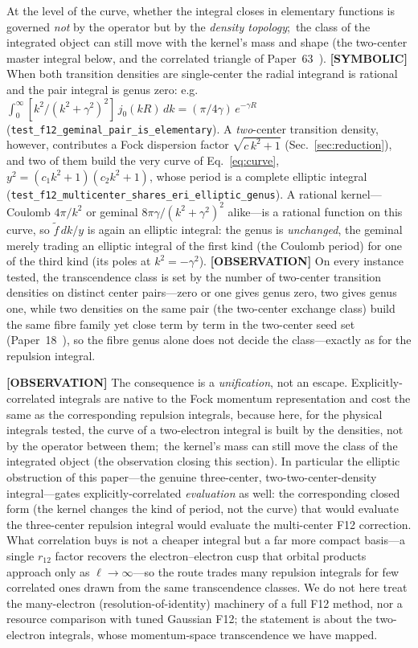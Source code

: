 \documentclass[aps,pra,twocolumn,superscriptaddress,longbibliography]{revtex4-2}
\begin{document}
At the level of the curve, whether the integral closes in elementary functions is governed
\emph{not} by the operator but by the \emph{density topology};\ the class of the integrated
object can still move with the kernel's mass and shape (the two-center master integral below,
and the correlated triangle of Paper~63~\cite{loutey_paper63}).  \textbf{[SYMBOLIC]} When both transition densities are
single-center the radial integrand is rational and the pair integral is genus zero: e.g.\
$\int_{0}^{\infty}[k^{2}/(k^{2}+\gamma^{2})^{2}]\,j_{0}(kR)\,dk=(\pi/4\gamma)\,e^{-\gamma R}$
(\texttt{test\_f12\_geminal\_pair\_is\_elementary}).  A \emph{two}-center transition density,
however, contributes a Fock dispersion factor $\sqrt{c\,k^{2}+1}$
(Sec.~\ref{sec:reduction}), and two of them build the very curve of Eq.~\eqref{eq:curve},
$y^{2}=(c_{1}k^{2}+1)(c_{2}k^{2}+1)$, whose period is a complete elliptic integral
(\texttt{test\_f12\_multicenter\_shares\_eri\_elliptic\_genus}).  A rational kernel---Coulomb
$4\pi/k^{2}$ or geminal $8\pi\gamma/(k^{2}+\gamma^{2})^{2}$ alike---is a rational function on
this curve, so $\widetilde f\,dk/y$ is again an elliptic integral: the genus is
\emph{unchanged}, the geminal merely trading an elliptic integral of the first kind (the
Coulomb period) for one of the third kind (its poles at $k^{2}=-\gamma^{2}$).  \textbf{[OBSERVATION]} On every
instance tested, the transcendence class is set by the number of two-center transition densities on distinct
center pairs---zero or one gives genus zero, two gives genus one, while two densities on the
same pair (the two-center exchange class) build the same fibre family yet close term by term in the
two-center seed set (Paper~18~\cite{loutey_paper18}), so the fibre genus alone does not
decide the class---exactly as for the repulsion integral.

\textbf{[OBSERVATION]} The consequence is a \emph{unification}, not an escape.  Explicitly-correlated integrals are
native to the Fock momentum representation and cost the same as the corresponding repulsion
integrals, because here, for the physical integrals tested, the curve of a two-electron
integral is built by the densities, not by the operator between them;\ the kernel's mass can
still move the class of the integrated object (the observation closing this section).  In particular the elliptic obstruction of
this paper---the genuine three-center, two-two-center-density integral---gates
explicitly-correlated \emph{evaluation} as well: the corresponding closed form (the
kernel changes the kind of period, not the curve) that would evaluate the
three-center repulsion integral would evaluate the multi-center F12 correction.  What
correlation buys is not a cheaper integral but a far more compact basis---a single
$r_{12}$ factor recovers the electron--electron cusp that orbital products approach only as
$\ell\to\infty$---so the route trades many repulsion integrals for few correlated ones drawn
from the same transcendence classes.  We do not here treat the many-electron
(resolution-of-identity) machinery of a full F12 method, nor a resource comparison with tuned
Gaussian F12; the statement is about the two-electron integrals, whose momentum-space
transcendence we have mapped.
\end{document}

